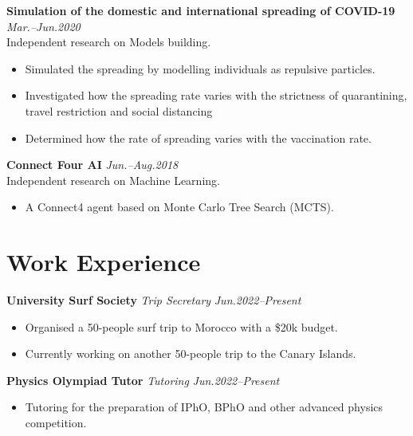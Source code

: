 \documentclass[11pt,a4paper,roman]{moderncv}        %
\begin{document}
\textbf{Simulation of the domestic and international spreading of COVID-19} \hfill \textit{Mar.--Jun.2020} 
\vspace*{1mm}\\
{Independent research on Models building.}
\vspace*{1mm}
\begin{itemize}
	\item Simulated the spreading by modelling individuals as repulsive particles.
    \item Investigated how the spreading rate varies with the strictness of quarantining, travel restriction and  social distancing
    \item Determined how the rate of spreading varies with the vaccination rate.\\
\end{itemize}

\textbf{Connect Four AI} \hfill \textit{Jun.--Aug.2018} 
\vspace*{1mm}\\
{Independent research on Machine Learning.}
\vspace*{1mm}
\begin{itemize}
	\item A Connect4 agent based on Monte Carlo Tree Search (MCTS).
\end{itemize}

\section{Work Experience}

\textbf{University Surf Society} \textit{Trip Secretary} \hfill \textit{Jun.2022--Present}
\vspace*{1mm}
\begin{itemize}
	\item Organised a 50-people surf trip to Morocco with a \$20k budget.
	\item Currently working on another 50-people trip to the Canary Islands.\\
\end{itemize}

\textbf{Physics Olympiad Tutor} \textit{Tutoring} \hfill \textit{Jun.2022--Present}
\vspace*{1mm}
\begin{itemize}
	\item Tutoring for the preparation of IPhO, BPhO and other advanced physics competition.\\
\end{itemize}
\end{document}

